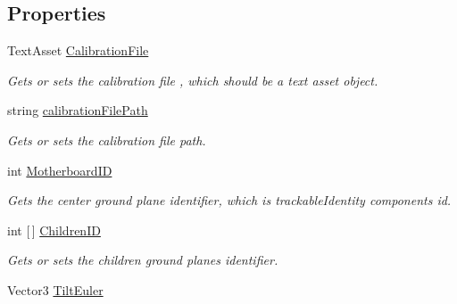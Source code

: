 \subsection*{Properties}
\begin{DoxyCompactItemize}
\item 
Text\+Asset \mbox{\hyperlink{class_ximmerse_1_1_rhino_x_1_1_composite_ground_plane_a63ac9972defc6a1f312432e742d99f5d}{Calibration\+File}}
\begin{DoxyCompactList}\small\item\em Gets or sets the calibration file , which should be a text asset object. \end{DoxyCompactList}\item 
string \mbox{\hyperlink{class_ximmerse_1_1_rhino_x_1_1_composite_ground_plane_af02c87df8dd7b1fd6a3dc1bfdd221754}{calibration\+File\+Path}}
\begin{DoxyCompactList}\small\item\em Gets or sets the calibration file path. \end{DoxyCompactList}\item 
int \mbox{\hyperlink{class_ximmerse_1_1_rhino_x_1_1_composite_ground_plane_a7aaaeb179ceb4f9fcdc59c4880d401c5}{Motherboard\+ID}}
\begin{DoxyCompactList}\small\item\em Gets the center ground plane identifier, which is trackable\+Identity component\textquotesingle{}s id. \end{DoxyCompactList}\item 
int \mbox{[}$\,$\mbox{]} \mbox{\hyperlink{class_ximmerse_1_1_rhino_x_1_1_composite_ground_plane_ab552f26590987a0d45b84f0b05ca6a03}{Children\+ID}}
\begin{DoxyCompactList}\small\item\em Gets or sets the children ground planes identifier. \end{DoxyCompactList}\item 
Vector3 \mbox{\hyperlink{class_ximmerse_1_1_rhino_x_1_1_composite_ground_plane_a0c19ad531b87d3b3cd8f91f018339a41}{Tilt\+Euler}}

\end{DoxyCompactItemize}
